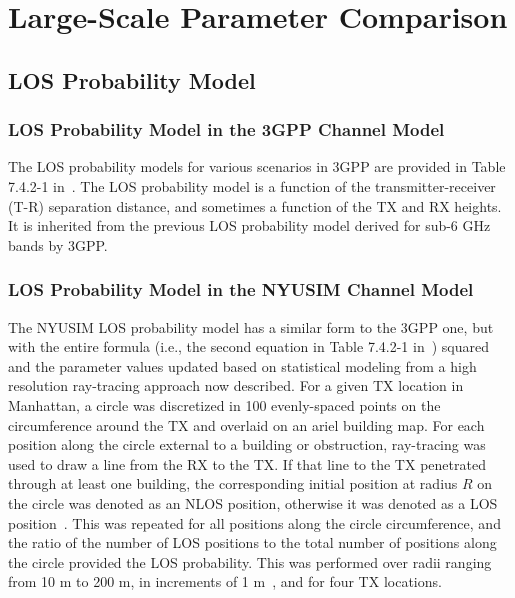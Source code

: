 \documentclass[journal]{IEEEtran}
\begin{document}
\section{Large-Scale Parameter Comparison}
\subsection{LOS Probability Model}
\subsubsection{LOS Probability Model in the 3GPP Channel Model}
The LOS probability models for various scenarios in 3GPP are provided in Table 7.4.2-1 in~\cite{3GPP_Dec}. The LOS probability model is a function of the transmitter-receiver (T-R) separation distance, and sometimes a function of the TX and RX heights. It is inherited from the previous LOS probability model derived for sub-6 GHz bands by 3GPP.

\subsubsection{LOS Probability Model in the NYUSIM Channel Model}
The NYUSIM LOS probability model has a similar form to the 3GPP one, but with the entire formula (i.e., the second equation in Table 7.4.2-1 in~\cite{3GPP_Dec}) squared and the parameter values updated based on statistical modeling from a high resolution ray-tracing approach now described. For a given TX location in Manhattan, a circle was discretized in 100 evenly-spaced points on the circumference around the TX and overlaid on an ariel building map. For each position along the circle external to a building or obstruction, ray-tracing was used to draw a line from the RX to the TX. If that line to the TX penetrated through at least one building, the corresponding initial position at radius $R$ on the circle was denoted as an NLOS position, otherwise it was denoted as a LOS position~\cite{Samimi15_Pro}. This was repeated for all positions along the circle circumference, and the ratio of the number of LOS positions to the total number of positions along the circle provided the LOS probability. This was performed over radii ranging from 10 m to 200 m, in increments of 1 m~\cite{Samimi15_Pro}, and for four TX locations.
\end{document}
